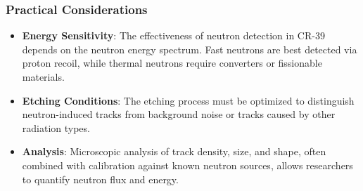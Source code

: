 \documentclass[
]{article}
\renewcommand{\[}{\begin{equation}}
\renewcommand{\]}{\end{equation}}
\providecommand{\tightlist}{%
  \setlength{\itemsep}{0pt}\setlength{\parskip}{0pt}}
\begin{document}
\subsubsection{Practical Considerations}\label{practical-considerations}

\begin{itemize}
\tightlist
\item
  \textbf{Energy Sensitivity}: The effectiveness of neutron detection in
  CR-39 depends on the neutron energy spectrum. Fast neutrons are best
  detected via proton recoil, while thermal neutrons require converters
  or fissionable materials.
\item
  \textbf{Etching Conditions}: The etching process must be optimized to
  distinguish neutron-induced tracks from background noise or tracks
  caused by other radiation types.
\item
  \textbf{Analysis}: Microscopic analysis of track density, size, and
  shape, often combined with calibration against known neutron sources,
  allows researchers to quantify neutron flux and energy.
\end{itemize}

\printbibliography
\end{document}
